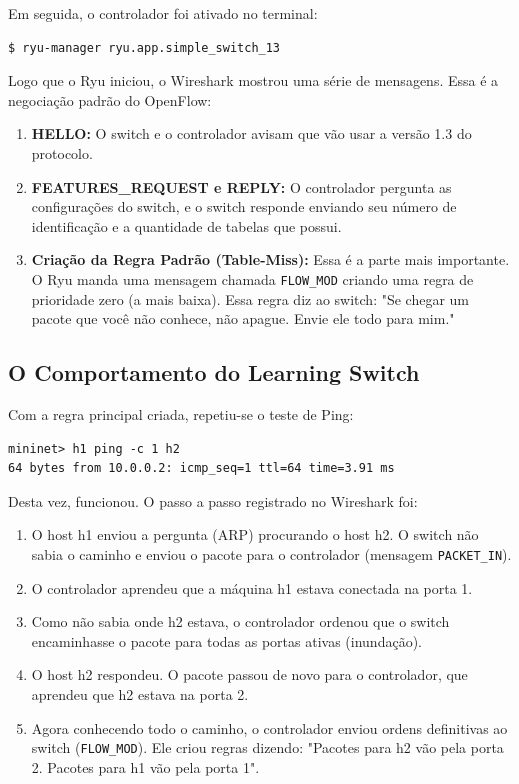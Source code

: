 \documentclass[12pt,a4paper]{article}
\begin{document}
Em seguida, o controlador foi ativado no terminal:
\begin{lstlisting}
$ ryu-manager ryu.app.simple_switch_13
\end{lstlisting}

Logo que o Ryu iniciou, o Wireshark mostrou uma série de mensagens. Essa é a negociação padrão do OpenFlow:
\begin{enumerate}
    \item \textbf{HELLO:} O switch e o controlador avisam que vão usar a versão 1.3 do protocolo.
    \item \textbf{FEATURES\_REQUEST e REPLY:} O controlador pergunta as configurações do switch, e o switch responde enviando seu número de identificação e a quantidade de tabelas que possui.
    \item \textbf{Criação da Regra Padrão (Table-Miss):} Essa é a parte mais importante. O Ryu manda uma mensagem chamada \texttt{FLOW\_MOD} criando uma regra de prioridade zero (a mais baixa). Essa regra diz ao switch: "Se chegar um pacote que você não conhece, não apague. Envie ele todo para mim."
\end{enumerate}

\subsection{O Comportamento do Learning Switch}

Com a regra principal criada, repetiu-se o teste de Ping:
\begin{lstlisting}
mininet> h1 ping -c 1 h2
64 bytes from 10.0.0.2: icmp_seq=1 ttl=64 time=3.91 ms
\end{lstlisting}
Desta vez, funcionou. O passo a passo registrado no Wireshark foi:
\begin{enumerate}
    \item O host h1 enviou a pergunta (ARP) procurando o host h2. O switch não sabia o caminho e enviou o pacote para o controlador (mensagem \texttt{PACKET\_IN}).
    \item O controlador aprendeu que a máquina h1 estava conectada na porta 1.
    \item Como não sabia onde h2 estava, o controlador ordenou que o switch encaminhasse o pacote para todas as portas ativas (inundação).
    \item O host h2 respondeu. O pacote passou de novo para o controlador, que aprendeu que h2 estava na porta 2.
    \item Agora conhecendo todo o caminho, o controlador enviou ordens definitivas ao switch (\texttt{FLOW\_MOD}). Ele criou regras dizendo: "Pacotes para h2 vão pela porta 2. Pacotes para h1 vão pela porta 1".
\end{enumerate}
\end{document}
